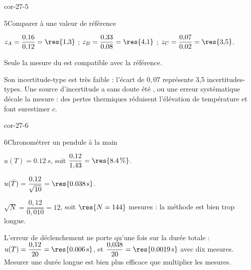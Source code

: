 \begin{blocLivre}{cor-27-5}
\begin{corrige}{5}{Comparer à une valeur de référence}
\begin{questions}
\item $z_A=\dfrac{0{,}16}{0{,}12}=\res{1{,}3}$ ; $z_B=\dfrac{0{,}33}{0{,}08}=\res{4{,}1}$ ; $z_C=\dfrac{0{,}07}{0{,}02}=\res{3{,}5}$.
\item Seule la mesure du  est compatible avec la référence.
\item Son incertitude-type est très faible : l'écart de $0{,}07$ représente 3,5 incertitudes-types. Une source d'incertitude
a sans doute été , ou une erreur systématique décale la mesure : des pertes thermiques réduisent
l'élévation de température et font surestimer $c$.
\end{questions}
\end{corrige}
\end{blocLivre}
\begin{blocLivre}{cor-27-6}
\begin{corrige}{6}{Chronométrer un pendule à la main}
\begin{questions}
\item $u(T)=\qty{0,12}{s}$, soit $\dfrac{0{,}12}{1{,}43}=\res{\qty{8,4}{\percent}}$.
\item $u(\bar T)=\dfrac{0{,}12}{\sqrt{10}}=\res{\qty{0,038}{s}}$.
\item $\sqrt N=\dfrac{0{,}12}{0{,}010}=12$, soit $\res{N=144}$ mesures : la méthode est bien trop longue.
\item L'erreur de déclenchement ne porte qu'une fois sur la durée totale : $u(T)=\dfrac{0{,}12}{20}=\res{\qty{0,006}{s}}$, et
$\dfrac{0{,}038}{20}=\res{\qty{0,0019}{s}}$ avec dix mesures. Mesurer une durée longue est bien plus efficace que multiplier les
mesures.
\end{questions}
\end{corrige}
\end{blocLivre}
